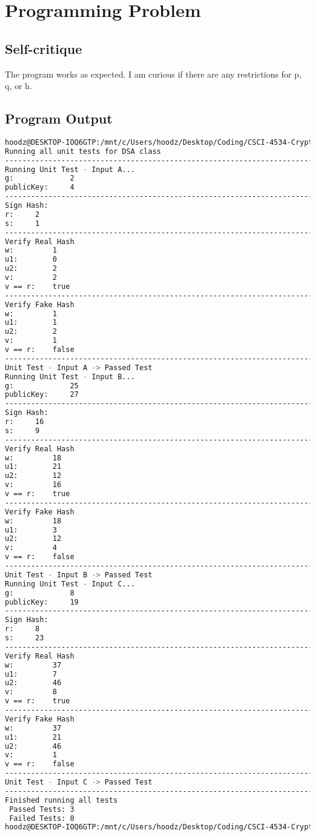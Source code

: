 \documentclass{article}
\begin{document}
\section*{Programming Problem}
    \subsection*{Self-critique}
        The program works as expected. I am curious if there are any restrictions for p, q, or h.
    
    \subsection*{Program Output}
    \begin{lstlisting}[language=bash]
    hoodz@DESKTOP-IOQ6GTP:/mnt/c/Users/hoodz/Desktop/Coding/CSCI-4534-Cryptography/Homework-3$ ./main
Running all unit tests for DSA class
----------------------------------------------------------------------------
Running Unit Test - Input A...
g:             2
publicKey:     4
----------------------------------------------------------------------------
Sign Hash:
r:     2
s:     1
----------------------------------------------------------------------------
Verify Real Hash
w:         1
u1:        0
u2:        2
v:         2
v == r:    true
----------------------------------------------------------------------------
Verify Fake Hash
w:         1
u1:        1
u2:        2
v:         1
v == r:    false
----------------------------------------------------------------------------
Unit Test - Input A -> Passed Test 
Running Unit Test - Input B...
g:             25
publicKey:     27
----------------------------------------------------------------------------
Sign Hash:
r:     16
s:     9
----------------------------------------------------------------------------
Verify Real Hash
w:         18
u1:        21
u2:        12
v:         16
v == r:    true
----------------------------------------------------------------------------
Verify Fake Hash
w:         18
u1:        3
u2:        12
v:         4
v == r:    false
----------------------------------------------------------------------------
Unit Test - Input B -> Passed Test 
Running Unit Test - Input C...
g:             8
publicKey:     19
----------------------------------------------------------------------------
Sign Hash:
r:     8
s:     23
----------------------------------------------------------------------------
Verify Real Hash
w:         37
u1:        7
u2:        46
v:         8
v == r:    true
----------------------------------------------------------------------------
Verify Fake Hash
w:         37
u1:        21
u2:        46
v:         1
v == r:    false
----------------------------------------------------------------------------
Unit Test - Input C -> Passed Test 
----------------------------------------------------------------------------
Finished running all tests
 Passed Tests: 3
 Failed Tests: 0
hoodz@DESKTOP-IOQ6GTP:/mnt/c/Users/hoodz/Desktop/Coding/CSCI-4534-Cryptography/Homework-3$ 
    \end{lstlisting}
    
\end{document}
